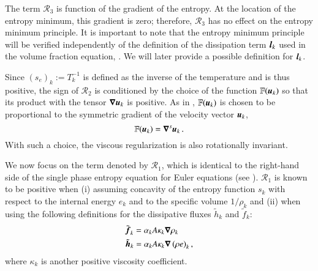 \documentclass[preprint,10pt]{elsarticle}
\begin{document}
The term ${\mathcal{R}_3}$ is  function of the gradient of the entropy.  
At the location of the entropy minimum, this gradient is zero; therefore, $\mathcal{R}_3$ 
has no effect on the entropy minimum principle. It is important to note that the entropy minimum principle will be verified
independently of the definition of the dissipation term $\boldsymbol l_k$ used in the volume fraction
equation, . We will later provide a possible definition for $\boldsymbol l_k$.

Since $(s_e)_k:=T_k^{-1}$ is defined as the inverse of the temperature and is thus positive, the sign of $\mathcal{R}_2$ is conditioned by the choice of the function $\mathbb{F}(\boldsymbol u_k)$ so that its product with the tensor $\boldsymbol\nabla \boldsymbol u_k$ is positive. As in \cite{jlg, Marco_paper_low_mach}, $\mathbb{F}(\boldsymbol u_k)$ is chosen to be proportional to the symmetric gradient of the velocity vector $\boldsymbol u_k$, %
\begin{equation}
\mathbb{F}(\boldsymbol u_k) = \boldsymbol\nabla^s \boldsymbol u_k \,.
\end{equation}
With such a choice, the viscous regularization is also rotationally invariant.
%

We now focus on the term denoted by $\mathcal{R}_1$, which is identical to the right-hand side of the single phase entropy equation for Euler equations (see \cite{jlg, Marco_paper_low_mach}). $\mathcal{R}_1$ is known to be positive when (i) assuming concavity of the entropy function $s_k$ with respect to the internal energy $e_k$ and to the specific volume $1 / \rho_k$ and (ii) when using the following definitions for the dissipative fluxes $\tilde{h}_k$ and $\tilde{f}_k$:
%
\begin{subequations} \label{eq:def_visc}
\begin{align}
&\tilde{\boldsymbol f}_k = \alpha_k A \kappa_k \boldsymbol\nabla \rho_k \\
&\tilde{\boldsymbol h}_k = \alpha_k A \kappa_k \boldsymbol\nabla \left( \rho e \right)_k,
\end{align}
\end{subequations}
%  
where $\kappa_k$ is another positive viscosity coefficient. 
\end{document}
